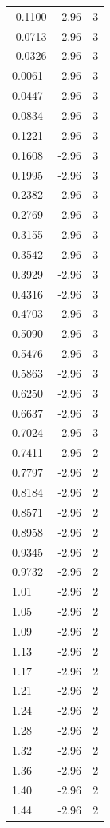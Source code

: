 \begin{longtable}{lrr}
  -0.1100 & -2.96 & 3 \\
  -0.0713 & -2.96 & 3 \\
  -0.0326 & -2.96 & 3 \\
  0.0061 & -2.96 & 3 \\
  0.0447 & -2.96 & 3 \\
  0.0834 & -2.96 & 3 \\
  0.1221 & -2.96 & 3 \\
  0.1608 & -2.96 & 3 \\
  0.1995 & -2.96 & 3 \\
  0.2382 & -2.96 & 3 \\
  0.2769 & -2.96 & 3 \\
  0.3155 & -2.96 & 3 \\
  0.3542 & -2.96 & 3 \\
  0.3929 & -2.96 & 3 \\
  0.4316 & -2.96 & 3 \\
  0.4703 & -2.96 & 3 \\
  0.5090 & -2.96 & 3 \\
  0.5476 & -2.96 & 3 \\
  0.5863 & -2.96 & 3 \\
  0.6250 & -2.96 & 3 \\
  0.6637 & -2.96 & 3 \\
  0.7024 & -2.96 & 3 \\
  0.7411 & -2.96 & 2 \\
  0.7797 & -2.96 & 2 \\
  0.8184 & -2.96 & 2 \\
  0.8571 & -2.96 & 2 \\
  0.8958 & -2.96 & 2 \\
  0.9345 & -2.96 & 2 \\
  0.9732 & -2.96 & 2 \\
  1.01 & -2.96 & 2 \\
  1.05 & -2.96 & 2 \\
  1.09 & -2.96 & 2 \\
  1.13 & -2.96 & 2 \\
  1.17 & -2.96 & 2 \\
  1.21 & -2.96 & 2 \\
  1.24 & -2.96 & 2 \\
  1.28 & -2.96 & 2 \\
  1.32 & -2.96 & 2 \\
  1.36 & -2.96 & 2 \\
  1.40 & -2.96 & 2 \\
  1.44 & -2.96 & 2 \\

\end{longtable}

